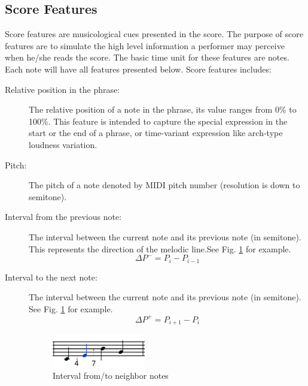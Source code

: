 \subsection{Score Features}
      Score features are musicological cues presented in the score. The purpose of score features are to simulate the high level information a performer may perceive when he/she reads the score. The basic time unit for these features are notes. Each note will have all features presented below.
      Score features includes:
      \begin{description}
         \item [Relative position in the phrase:]
            The relative position of a note in the phrase, its value ranges from 0\% to 100\%. %
            This feature is intended to capture the special expression in the start or the end of a phrase, or time-variant expression like arch-type loudness variation.
         \item [Pitch:]
            The pitch of a note denoted by MIDI pitch number (resolution is down to semitone). %

         \item [Interval from the previous note:] The interval between the current note and its previous note (in semitone). This represents the direction of the melodic line.See Fig. \ref{fig:interval} for example. $$\Delta P^- = P_{i} - P_{i-1} $$ 
         \item [Interval to the next note:] The interval between the current note and its previous note (in semitone). See Fig. \ref{fig:interval} for example. $$\Delta P^+ = P_{i+1} - P_i$$ 
         
      \begin{figure}[tp]
         \begin{center}
            \includegraphics[width=0.4\textwidth]{fig/interval_arrow}
         \end{center}
         \caption{Interval from/to neighbor notes}
         \label{fig:interval}
      \end{figure}


\end{description}
